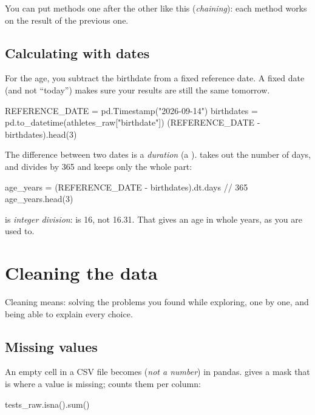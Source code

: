 \documentclass[11pt,a4paper]{article}
\begin{document}
You can put methods one after the other like this (\emph{chaining}):
each method works on the result of the previous one.

\subsection{Calculating with dates}

For the age, you subtract the birthdate from a fixed reference date. A
fixed date (and not ``today'') makes sure your results are still the
same tomorrow.

\begin{python}
REFERENCE_DATE = pd.Timestamp("2026-09-14")
birthdates = pd.to_datetime(athletes_raw["birthdate"])
(REFERENCE_DATE - birthdates).head(3)
\end{python}

The difference between two dates is a \emph{duration} (a
).  takes out the number of days, and
 divides by 365 and keeps only the whole part:

\begin{python}
age_years = (REFERENCE_DATE - birthdates).dt.days // 365
age_years.head(3)
\end{python}

\code{//} is \emph{integer division}:  is 16, not
16.31. That gives an age in whole years, as you are used to.

\section{Cleaning the data}\label{sec:cleaning}

Cleaning means: solving the problems you found while exploring, one by
one, and being able to explain every choice.

\subsection{Missing values}

An empty cell in a CSV file becomes  (\emph{not a number}) in
pandas.  gives a mask that is  where a value is
missing;  counts them per column:

\begin{python}
tests_raw.isna().sum()
\end{python}
\end{document}
